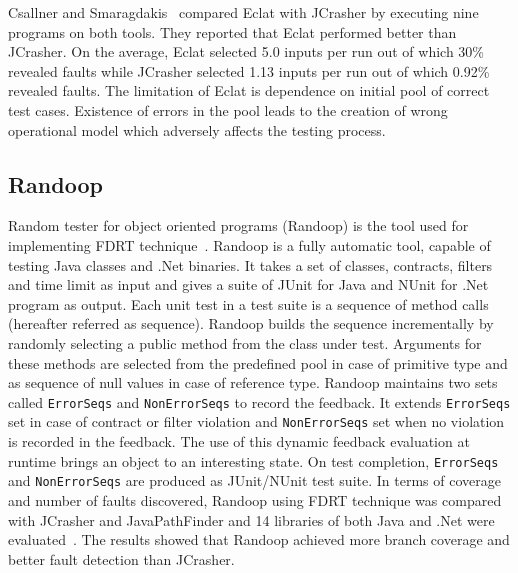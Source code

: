 Csallner and Smaragdakis~\cite{pacheco2007randoop} compared Eclat with JCrasher by executing nine programs on  both tools. They reported that Eclat performed better than JCrasher. On the average, Eclat selected 5.0 inputs per run out of which 30\% revealed faults while JCrasher selected 1.13 inputs per run out of which 0.92\% revealed faults. The limitation of Eclat is dependence on initial pool of correct test cases. Existence of errors in the pool leads to the creation of wrong operational model which adversely affects the testing process.   



\subsection{Randoop}
Random tester for object oriented programs (Randoop) is the tool used for implementing FDRT technique~\cite{pacheco2007randoop}. Randoop is a fully automatic tool, capable of testing Java classes and .Net binaries. It takes a set of classes, contracts, filters and time limit as input and gives a suite of JUnit for Java and NUnit for .Net program as output. Each unit test in a test suite is a sequence of method calls (hereafter referred as sequence). Randoop builds the sequence incrementally by randomly selecting a public method from the class under test.  Arguments for these methods are selected from the predefined pool in case of primitive type and as sequence of null values in case of reference type. Randoop maintains two sets called \verb+ErrorSeqs+ and \verb+NonErrorSeqs+ to record the feedback. It extends \verb+ErrorSeqs+ set in case of contract or filter violation and \verb+NonErrorSeqs+ set when no violation is recorded in the feedback. The use of this dynamic feedback evaluation at runtime brings an object to an interesting state. On test completion, \verb+ErrorSeqs+ and \verb+NonErrorSeqs+ are produced as JUnit/NUnit test suite. In terms of coverage and number of faults discovered, Randoop using FDRT technique was compared with JCrasher and JavaPathFinder and 14 libraries of both Java and .Net were evaluated~\cite{visser2004test}. The results showed that Randoop achieved more branch coverage and better fault detection than JCrasher. 


